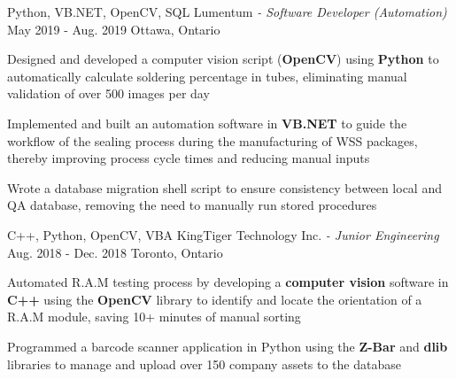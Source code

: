 \begin{siderules}
\begin{cventries}
{\begin{cvitems}
      \end{cvitems}
    }
    \cventry
      {Python, VB.NET, OpenCV, SQL}
      {Lumentum\hspace{0.15em} \bodyfontlight\itshape{- Software Developer (Automation)}}
      {May 2019 - Aug. 2019}
      {Ottawa, Ontario}
      {
        \begin{cvitems}
          \item {Designed and developed a computer vision script (\textbf{OpenCV}) using \textbf{Python} to automatically calculate soldering percentage in tubes, eliminating manual validation of over 500 images per day}
          \item {Implemented and built an automation software in \textbf{VB.NET} to guide the workflow of the sealing process during the manufacturing of WSS packages, thereby improving process cycle times and reducing manual inputs}
          \item {Wrote a database migration shell script to ensure consistency between local and QA database, removing the need to manually run stored procedures}
        \end{cvitems}
      }
    \cventry
      {C++, Python, OpenCV, VBA}
      {KingTiger Technology Inc.\hspace{0.15em} \bodyfontlight\itshape{- Junior Engineering}}
      {Aug. 2018 - Dec. 2018}
      {Toronto, Ontario}
      {
        \begin{cvitems}
          \item {Automated R.A.M testing process by developing a \textbf{computer vision} software in \textbf{C++} using the \textbf{OpenCV} library to identify and locate the orientation of a R.A.M module, saving 10+ minutes of manual sorting}
          \item {Programmed a barcode scanner application in Python using the \textbf{Z-Bar} and \textbf{dlib} libraries to manage and upload over 150 company assets to the database}
        \end{cvitems}
      }
  \end{cventries}
\end{siderules}